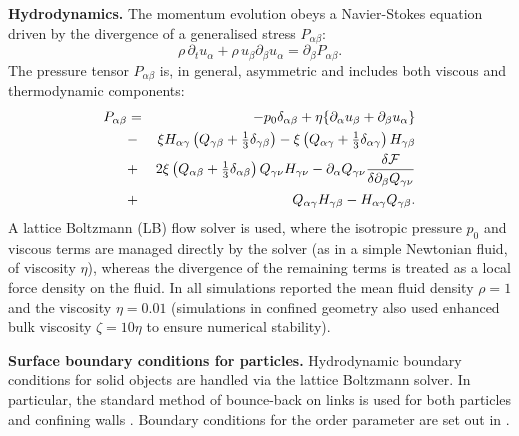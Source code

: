 \documentclass[12pt]{article}
\begin{document}
\medskip
\noindent
\textbf{Hydrodynamics.}
The momentum evolution obeys a Navier-Stokes equation driven by the divergence
of a generalised stress $P_{\alpha\beta}$:
\begin{equation}
\label{nse}
\rho\,\partial_tu_\alpha +\rho \,u_\beta \partial_\beta u_\alpha
=\partial_\beta P_{\alpha\beta}.
\end{equation}
The pressure tensor $P_{\alpha\beta}$ is, in general, asymmetric and includes
both viscous and thermodynamic components:
\begin{eqnarray}
P_{\alpha \beta}&=&
- p_0 \delta_{\alpha \beta} 
+ \eta \{ \partial_\alpha u_\beta + \partial_\beta u_\alpha\}
\nonumber\\
&-&  \xi H_{\alpha \gamma}\left(Q_{\gamma \beta}
+ {\textstyle \frac{1}{3}} \delta_{\gamma \beta} \right)
-\xi \left(Q_{\alpha \gamma}
+ { \textstyle \frac{1}{3}} \delta_{\alpha \gamma}\right) H_{\gamma \beta}
\nonumber\\ 
&+& 2 \xi  \left(Q_{\alpha \beta}
+ {\textstyle \frac{1}{3}} \delta_{\alpha \beta}\right) Q_{\gamma \nu} H_{\gamma \nu}
-\partial_\alpha Q_{\gamma \nu}
\frac{\delta{\cal F}}{\delta \partial_{\beta} Q_{\gamma \nu}}\nonumber\\
&+& Q_{\alpha \gamma}H_{\gamma \beta}-H_{\alpha \gamma} Q_{\gamma \beta}.
\end{eqnarray}
A lattice Boltzmann (LB) flow solver is used, where the isotropic pressure
$p_0$
and viscous terms are managed directly by the solver (as in a simple Newtonian
fluid, of viscosity $\eta$), whereas the divergence of the remaining terms
is treated as a local force density on the fluid. In all simulations
reported the mean fluid density $\rho = 1$ and the viscosity
$\eta = 0.01$ (simulations in confined geometry also used enhanced
bulk viscosity $\zeta = 10\eta$ to ensure numerical stability).

\medskip
\noindent
\textbf{Surface boundary conditions for particles.}
Hydrodynamic boundary conditions for solid objects are handled via
the lattice Boltzmann solver. In particular, the standard method of
bounce-back on links is used for both particles and confining walls
\cite{ladd94,nguyen2002}. Boundary conditions for the order parameter
are set out in \cite{juho}.
\end{document}
